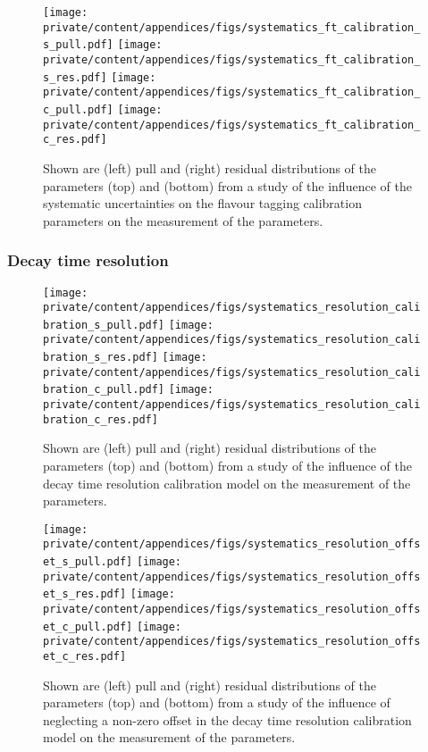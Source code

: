 \begin{figure}[h]
  \texttt{[image: private/content/appendices/figs/systematics\_ft\_calibration\_s\_pull.pdf]}\hfill
  \texttt{[image: private/content/appendices/figs/systematics\_ft\_calibration\_s\_res.pdf]}
  \texttt{[image: private/content/appendices/figs/systematics\_ft\_calibration\_c\_pull.pdf]}\hfill
  \texttt{[image: private/content/appendices/figs/systematics\_ft\_calibration\_c\_res.pdf]}
\caption{Shown are (left) pull and (right) residual distributions of the
parameters (top) \SJpsiKS and (bottom) \CJpsiKS from a \ToyMC study of the
influence of the systematic uncertainties on the flavour tagging calibration
parameters on the measurement of the \CP parameters.}
\label{fig:app:measurement_of_sin2beta:systematics:systematics:tagging}
\end{figure}

\clearpage
\subsubsection{Decay time resolution}
\label{sec:app:measurement_of_sin2beta:systematics:systematics:resolution}

\begin{figure}[h]
  \texttt{[image: private/content/appendices/figs/systematics\_resolution\_calibration\_s\_pull.pdf]}\hfill
  \texttt{[image: private/content/appendices/figs/systematics\_resolution\_calibration\_s\_res.pdf]}
  \texttt{[image: private/content/appendices/figs/systematics\_resolution\_calibration\_c\_pull.pdf]}\hfill
  \texttt{[image: private/content/appendices/figs/systematics\_resolution\_calibration\_c\_res.pdf]}
\caption{Shown are (left) pull and (right) residual distributions of the
parameters (top) \SJpsiKS and (bottom) \CJpsiKS from a \ToyMC study of the
influence of the decay time resolution calibration model on the measurement of
the \CP parameters.}
\label{fig:app:measurement_of_sin2beta:systematics:systematics:resolution:calibration}
\end{figure}

\begin{figure}[h]
  \texttt{[image: private/content/appendices/figs/systematics\_resolution\_offset\_s\_pull.pdf]}\hfill
  \texttt{[image: private/content/appendices/figs/systematics\_resolution\_offset\_s\_res.pdf]}
  \texttt{[image: private/content/appendices/figs/systematics\_resolution\_offset\_c\_pull.pdf]}\hfill
  \texttt{[image: private/content/appendices/figs/systematics\_resolution\_offset\_c\_res.pdf]}
\caption{Shown are (left) pull and (right) residual distributions of the
parameters (top) \SJpsiKS and (bottom) \CJpsiKS from a \ToyMC study of the
influence of neglecting a non-zero offset in the decay time resolution
calibration model on the measurement of the \CP parameters.}
\label{fig:app:measurement_of_sin2beta:systematics:systematics:resolution:offset}
\end{figure}

